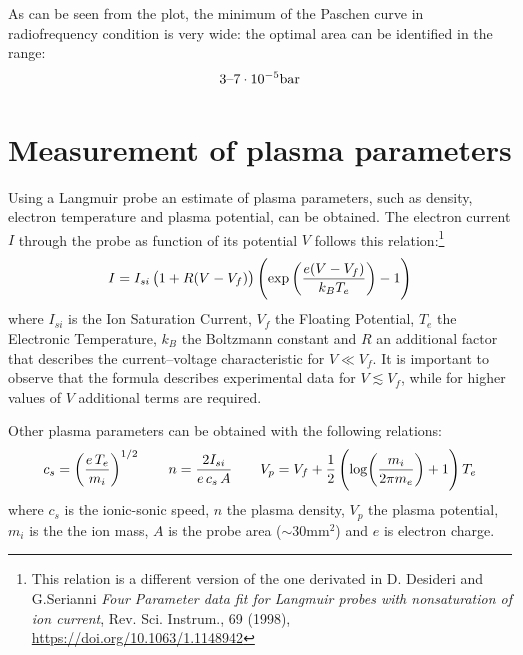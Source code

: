 \documentclass[11pt,a4 paper]{article}
\let\oldfrac\frac
\renewcommand{\frac}[3][d]{\ifthenelse{\equal{#1}{d}}{\oldfrac{#2}{#3}}{\nicefrac{#2}{#3}}}
\begin{document}

As can be seen from the plot, the minimum of the Paschen curve in radiofrequency condition is very wide: the optimal area can be identified in the range: $$3\textup{--}7 \cdot 10^{-5}\si{\bar}$$

\section{Measurement of plasma parameters}
Using a Langmuir probe an estimate of plasma parameters, such as density, electron temperature and plasma potential, can be obtained.
The electron current $I$ through the probe as function of its potential $V$ follows this relation:\footnote{This relation is a different version of the one derivated in D. Desideri and G.Serianni \emph{Four Parameter data fit for Langmuir probes with nonsaturation of ion current}, Rev. Sci. Instrum., 69 (1998), \url{https://doi.org/10.1063/1.1148942}}
\[I=I_{si}\left(1+R(V-V_f)\right)\left(\exp\left(\frac{e(V-V_f)}{k_BT_e}\right)-1\right)\]
where $I_{si}$ is the Ion Saturation Current, $V_f$ the Floating Potential, $T_e$ the Electronic Temperature, $k_B$ the Boltzmann constant and $R$ an additional factor that describes the current--voltage characteristic for $V\ll V_f$.
It is important to observe that the formula describes experimental data for $V\lesssim V_f$, while for higher values of $V$ additional terms are required.

Other plasma parameters can be obtained with the following relations:
\begin{equation*}
  c_s=\left(\frac{e\,T_e}{m_i}\right)^{1/2} \qquad
  n=\frac{2I_{si}}{e\,c_s\,A} \qquad
  V_p=V_f+\frac12\left(\log(\frac{m_i}{2\pi m_e})+1\right) T_e
\end{equation*}
where $c_s$ is the ionic-sonic speed, $n$ the plasma density, $V_p$ the plasma potential, $m_i$ is the the ion mass, $A$ is the probe area ($\sim30\si{\milli\metre}^2$) and $e$ is electron charge.
\end{document}
